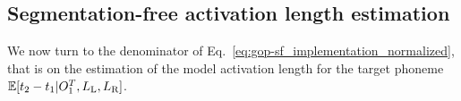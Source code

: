 

\subsection{Segmentation-free activation length estimation}
\label{sec:estimating_duration}
We now turn to the denominator of Eq.~\ref{eq:gop-sf_implementation_normalized}, that is on the estimation of the model activation length for the target phoneme $\mathbb{E}[t_2-t_1|O_1^T, L_{\text{L}}, L_{\text{R}}]$.


